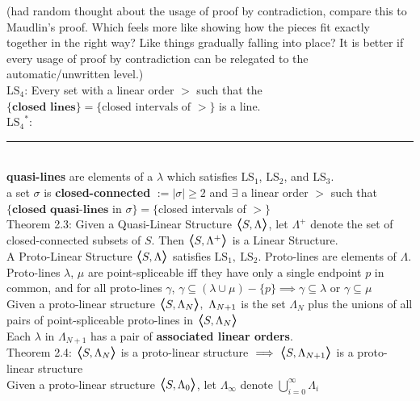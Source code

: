 \documentclass{article}
\newcommand{\hsp}[1][5]{\hspace{0.#1 cm}}
\newcommand{\hcm}[1][1]{\hspace{#1 cm}}
\newcommand{\bra}[1][1.2]{\scalebox{#1}{$\boldsymbol{\langle}$}}
\newcommand{\nl}[1][12]{\\[#1pt]}
\newcommand{\ket}[1][1.2]{\scalebox{#1}{$\boldsymbol{\rangle}$}}
\newcommand{\ch}[1]{\text{#1}}
\newcommand {\chb}[1]{\textbf{#1}}
\begin{document}
\begin{flushleft}
{	\hcm (had random thought about the usage of proof by contradiction, compare this to Maudlin's proof. Which feels more like showing how the pieces fit exactly together in the right way? Like things gradually falling into place? It is better if every usage of proof by contradiction can be relegated to the automatic/unwritten level.)
}\nl[10]

$\ch{LS}_4$: Every set with a linear order $>$ such that the $\{\chb{closed lines}\} = \{\ch{closed intervals of }>\}$ is a line.\nl[5]

{\color{purple}
	${\ch{LS}_4}^*$:\nl[10]
}

\par\noindent\rule{\textwidth}{0.4pt}\nl[5] %

\chb{quasi-lines} are elements of a $\lambda$ which satisfies $\ch{LS}_1$, $\ch{LS}_2$, and $\ch{LS}_3$.\nl[2]
\hsp[2] a set $\sigma$ is \chb{closed-connected} $ := |\sigma| \geq 2 $ and $\exists$ a linear order $>$ such that \\\hcm$\{\chb{closed quasi-lines}$ in $\sigma\} = \{$closed intervals of $>\}$\nl[10]

\hcm Theorem 2.3: Given a Quasi-Linear Structure $\bra S, \Lambda\ket$, let $\Lambda^+$ denote the set of closed-connected subsets of $S$. Then $\bra S, \Lambda^+\ket $ is a Linear Structure.\nl[20]

A Proto-Linear Structure $\bra S, \Lambda\ket$ satisfies $\ch{LS}_1,\ \ch{LS}_2$. Proto-lines are elements of $\Lambda$.\nl[10]

\hsp[2] Proto-lines $\lambda$, $\mu$ are point-spliceable iff they have only a single endpoint $p$ in common, and for all proto-lines $\gamma$, $\gamma \subseteq (\lambda \cup \mu) - \{p\} \implies \gamma \subseteq \lambda$ or $\gamma \subseteq \mu$\nl[10]

\hsp[2] Given a proto-linear structure $\bra S, \Lambda_N\ket,\ \Lambda_{N+1}$ is the set $ \Lambda_N$ plus the unions of all pairs of point-spliceable proto-lines in $\bra S, \Lambda_N\ket$\nl[10]

\hsp[2] Each $\lambda$ in $\Lambda_{N+1}$ has a pair of \chb{associated linear orders}.\nl[10]

\hcm Theorem 2.4: $\bra S, \Lambda_N\ket$ is a proto-linear structure $\implies \bra S, \Lambda_{N+1}\ket$ is a proto-linear structure\nl[10]

\hcm Given a proto-linear structure $\bra S, \Lambda_0\ket$, let $\Lambda_\infty$ denote $ \bigcup_{i=0}^\infty\Lambda_i$\nl[10]


\end{flushleft}
\end{document}
